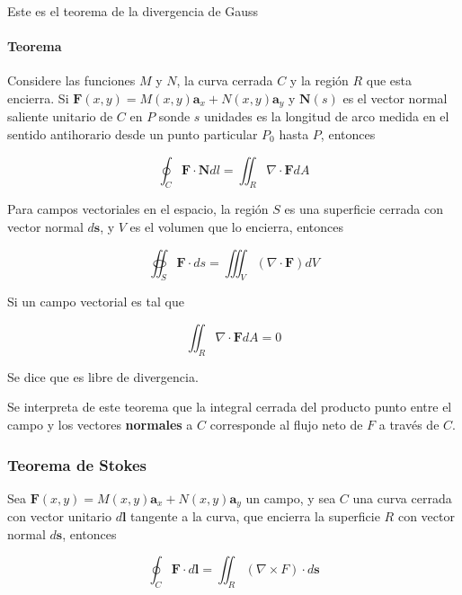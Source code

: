 Este es el teorema de la divergencia de Gauss

\paragraph*{Teorema} Considere las funciones $M$ y $N$, la curva cerrada $C$ y la región $R$ que esta encierra. Si $\mathbf{F}(x,y) = M(x,y) \mathbf{a}_x + N(x,y)\mathbf{a}_y$ y $\mathbf{N}(s)$ es el vector normal saliente unitario de $C$ en $P$ sonde $s$ unidades es la longitud de arco medida en el sentido antihorario desde un punto particular $P_0$ hasta $P$, entonces

\begin{equation*}
\oint_C \mathbf{F} \cdot \mathbf{N} dl = \iint_R \nabla \cdot \mathbf{F} d A
\end{equation*}


Para campos vectoriales en el espacio, la región $S$ es una superficie cerrada con vector normal $d \mathbf{s}$, y $V$ es el volumen que lo encierra, entonces

\begin{equation*}
\oiint_S \mathbf{F} \cdot d s = \iiint_V (\nabla \cdot \mathbf{F}) dV
\end{equation*}

Si un campo vectorial es tal que 

\begin{equation*}
\iint_R \nabla \cdot \mathbf{F} d A = 0
\end{equation*}

Se dice que es libre de divergencia.

Se interpreta de este teorema que la integral cerrada del producto punto entre el campo y los vectores \textbf{normales} a $C$ corresponde al flujo neto de $F$ a través de $C$.

\subsubsection{Teorema de Stokes} Sea $\mathbf{F}(x,y) =  M(x,y) \mathbf{a}_x + N(x,y) \mathbf{a}_y$ un campo, y sea $C$ una curva cerrada con vector unitario $d \mathbf{l}$ tangente a la curva, que encierra la superficie $R$ con vector normal $d \mathbf{s}$, entonces

\begin{equation*}
\oint_C \mathbf{F} \cdot d \mathbf{l} = \iint_R \left( \nabla \times F \right) \cdot d \mathbf{s}
\end{equation*}

